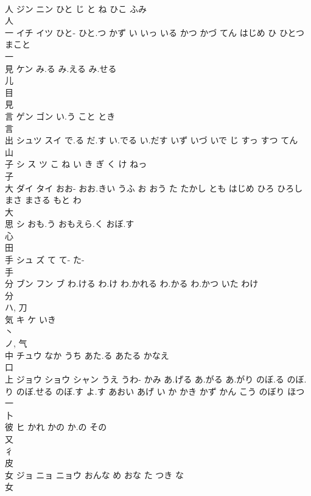 \documentclass[8pt]{extreport}
\begin{document}
\begin{CJK}{UTF8}{min}
\\	人	ジン ニン	ひと じ と ね ひこ ふみ	
\\	人 
\\	一	イチ イツ	ひと- ひと.つ かず い いっ いる かつ かづ てん はじめ ひ ひとつ まこと	
\\	一 
\\	見	ケン	み.る み.える み.せる	
\\	儿 
\\	目 
\\	見 
\\	言	ゲン ゴン	い.う こと とき	
\\	言 
\\	出	シュツ スイ	で.る だ.す い.でる い.だす いず いづ いで じ すっ すつ てん	
\\	山 
\\	子	シ ス ツ	こ ね い き ぎ く け ねっ	
\\	子 
\\	大	ダイ タイ	おお- おお.きい うふ お おう た たかし とも はじめ ひろ ひろし まさ まさる もと わ	
\\	大 
\\	思	シ	おも.う おもえら.く おぼ.す	
\\	心 
\\	田 
\\	手	シュ ズ	て て- た-	
\\	手 
\\	分	ブン フン ブ	わ.ける わ.け わ.かれる わ.かる わ.かつ いた わけ	
\\	分 
\\	ハ, 刀 
\\	気	キ ケ	いき	
\\	丶 
\\	ノ, 气 
\\	中	チュウ	なか うち あた.る あたる かなえ	
\\	口 
\\	上	ジョウ ショウ シャン	うえ うわ- かみ あ.げる あ.がる あ.がり のぼ.る のぼ.り のぼ.せる のぼ.す よ.す あおい あげ い か かき かず かん こう のぼり ほつ	
\\	一 
\\	卜 
\\	彼	ヒ	かれ かの か.の その	
\\	又 
\\	彳 
\\	皮 
\\	女	ジョ ニョ ニョウ	おんな め おな た つき な	
\\	女 

\end{CJK}
\end{document}
